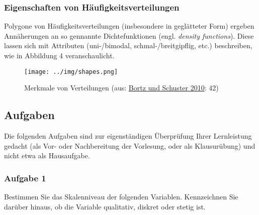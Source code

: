 \documentclass[
  ngerman,
]{article}
\begin{document}
\hypertarget{eigenschaften-von-huxe4ufigkeitsverteilungen}{%
\subsubsection{Eigenschaften von Häufigkeitsverteilungen}\label{eigenschaften-von-huxe4ufigkeitsverteilungen}}

Polygone von Häufigkeitsverteilungen (insbesondere in geglätteter Form) ergeben Annäherungen an so gennannte Dichtefunktionen (engl. \emph{density functions}). Diese lassen sich mit Attributen (uni-/bimodal, schmal-/breitgipflig, etc.) beschreiben, wie in Abbildung 4 veranschaulicht.

\begin{figure}
\centering
\texttt{[image: ../img/shapes.png]}
\caption{Merkmale von Verteilungen (aus: \protect\hyperlink{ref-bortz}{Bortz und Schuster 2010}: 42)}
\end{figure}

\pagebreak

\hypertarget{aufgaben}{%
\subsection{Aufgaben}\label{aufgaben}}

Die folgenden Aufgaben sind zur eigenständigen Überprüfung Ihrer Lernleistung gedacht (als Vor- oder Nachbereitung der Vorlesung, oder als Klausurübung) und nicht etwa als Hausaufgabe.

\hypertarget{aufgabe-1}{%
\subsubsection{Aufgabe 1}\label{aufgabe-1}}

Bestimmen Sie das Skalenniveau der folgenden Variablen. Kennzeichnen Sie darüber hinaus, ob die Variable qualitativ, diskret oder stetig ist.
\end{document}
